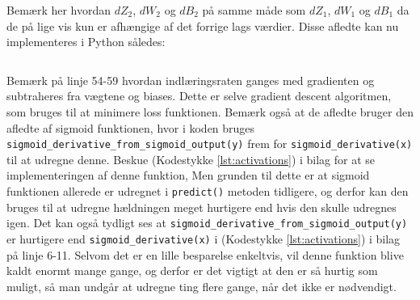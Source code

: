 \documentclass{article}
\newcommand{\listingref}[1]{(Kodestykke \ref{#1})}
\begin{document}
Bemærk her hvordan $dZ_2$, $dW_2$ og $dB_2$ på samme måde som $dZ_1$, $dW_1$ og $dB_1$ da de på lige vis kun er afhængige af det forrige lags værdier. Disse afledte kan nu implementeres i Python således:
\inputminted[firstline=42, lastline=59]{python}{train.py}\noindent
Bemærk på linje 54-59 hvordan indlæringsraten ganges med gradienten og subtraheres fra vægtene og biases. Dette er selve gradient descent algoritmen, som bruges til at minimere loss funktionen. Bemærk også at de afledte bruger den afledte af sigmoid funktionen, hvor i koden bruges \texttt{sigmoid\_derivative\_from\_sigmoid\_output(y)} frem for \texttt{sigmoid\_derivative(x)} til at udregne denne. Beskue \listingref{lst:activations} i bilag for at se implementeringen af denne funktion, Men grunden til dette er at sigmoid funktionen allerede er udregnet i \texttt{predict()} metoden tidligere, og derfor kan den bruges til at udregne hældningen meget hurtigere end hvis den skulle udregnes igen. Det kan også tydligt ses at \texttt{sigmoid\_derivative\_from\_sigmoid\_output(y)} er hurtigere end \texttt{sigmoid\_derivative(x)} i \listingref{lst:activations} i bilag på linje 6-11. Selvom det er en lille besparelse enkeltvis, vil denne funktion blive kaldt enormt mange gange, og derfor er det vigtigt at den er så hurtig som muligt, så man undgår at udregne ting flere gange, når det ikke er nødvendigt. \parencite{smith2024sigmoid}
\end{document}
